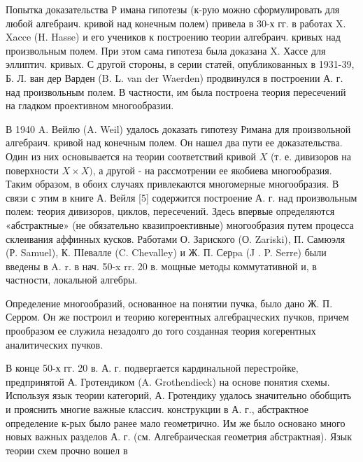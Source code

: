 \documentclass[10pt]{article}
\begin{document}
Попытка доказательства Р имана гипотезы (к-рую можно сформулировать для любой алгебраич. кривой над конечным полем) привела в 30-х гг. в работах X. Xacce (H. Hasse) и его учеников к построению теории алгебраич. кривых над произвольным полем. При этом сама гипотеза была доказана X. Хассе для эллиптич. кривых. С другой стороны, в серии статей, опубликованных в 1931-39, Б. Л. ван дер Варден (B. L. van der Waerden) продвинулся в построении А. г. над произвольным полем. В частности, им была построена теория пересечений на гладком проективном многообразии.



В 1940 A. Вейлю (A. Weil) удалось доказать гипотезу Римана для произвольной алгебраич. кривой над конечным полем. Он нашел два пути ее доказательства. Один из них основывается на теории соответствий кривой $X$ (т. е. дивизоров на поверхности $X \times X)$, а другой - на рассмотрении ее якобиева многообразия. Таким образом, в обоих случаях привлекаются многомерные многообразия. В связи с этим в книге А. Вейля [5] содержится построение А. г. над произвольным полем: теория дивизоров, циклов, пересечений. Здесь впервые определяются «абстрактные» (не обязательно квазипроективные) многообразия путем процесса склеивания аффинных кусков. Работами О. Зариского (О. Zariski), П. Самюэля (Р. Samuel), К. ПІевалле (C. Chevalley) и Ж. П. Серpa (J . P. Serre) были введены в A. r. в нач. 50-x rr. 20 в. мощные методы коммутативной и, в частности, локальной алгебры.



Определение многообразий, основанное на понятии пучка, было дано Ж. П. Серром. Он же построил и теорию когерентных алгебрацческих пучков, причем прообразом ее служила незадолго до того созданная теория когерентных аналитических пучков.



В конце 50-х гг. 20 в. А. г. подвергается кардинальной перестройке, предпринятой А. Гротендиком (A. Grothendieck) на основе понятия схемы. Используя язык теории категорий, А. Гротендику удалось значительно обобщить и прояснить многие важные классич. конструкции в А. г., абстрактное определение к-рых было ранее мало геометрично. Им же было основано много новых важных разделов А. г. (см. Алгебраическая геометрия абстрактная). Язык теории схем прочно вошел в
\end{document}
